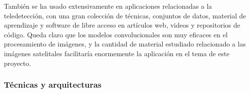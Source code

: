 También se ha usado extensivamente en aplicaciones relacionadas a la teledetección, con una gran colección de técnicas,
conjuntos de datos, material de aprendizaje y software de libre acceso en artículos web, videos y repositorios de
código. \autocite{tds-landuse-classification} \autocite{repo-satellite-image-dl} Queda claro que los modelos
convolucionales son muy eficaces en el procesamiento de imágenes, y la cantidad de material estudiado relacionado a las
imágenes satelitales facilitaría enormemente la aplicación en el tema de este proyecto.

\subsubsection{Técnicas y arquitecturas}
